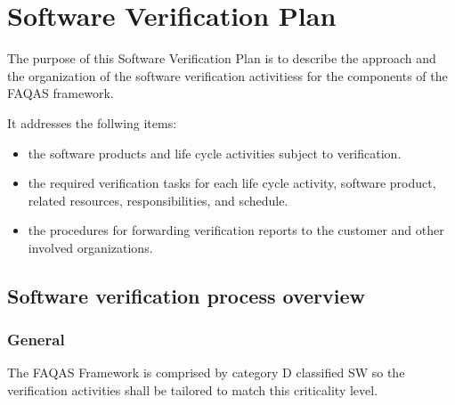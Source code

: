 \chapter{Software Verification Plan}




The purpose of this Software Verification Plan is to describe the approach and the organization of the software verification activitiess for the components of the FAQAS framework.

It addresses the follwing items:
\begin{itemize}
  \item the software products and life cycle activities
  subject to verification.
  \item the required verification tasks for each life cycle activity, software product, related resources, responsibilities, and schedule.
  \item the procedures for forwarding verification reports to the customer and other involved organizations.
\end{itemize}

\section{Software verification process overview}

\subsection{General}

The FAQAS Framework is comprised by category D classified SW so the verification activities shall be tailored to match this criticality level.

